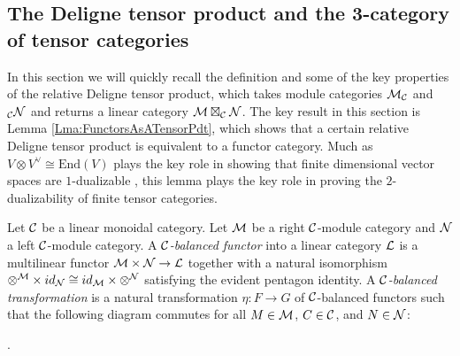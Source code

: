 \documentclass{amsart}
\begin{document}


\subsection{The Deligne tensor product and the 3-category of tensor categories} \label{sec:tc-deligne}

In this section we will quickly recall the definition and some of the key properties of the relative Deligne tensor product, which takes module categories $\mathcal M_\mathcal C$ and ${}_\mathcal C \mathcal N$ and returns a linear category $\mathcal M \boxtimes_\mathcal C \mathcal N$.  The key result in this section is Lemma \ref{Lma:FunctorsAsATensorPdt}, which shows that a certain relative Deligne tensor product is equivalent to a functor category.  Much as $V \otimes V^\vee \cong \mathrm{End}(V)$ plays the key role in showing that finite dimensional vector spaces are $1$-dualizable \cite[Ex. 1.1.9]{lurie-ch}, this lemma plays the key role in proving the $2$-dualizability of finite tensor categories.



\begin{definition}
	Let $\mathcal C$ be a linear monoidal category. 
	Let $\mathcal M$ be a right $\mathcal C$-module category and $\mathcal N$ a left $\mathcal C$-module category. A {\em $\mathcal C$-balanced functor} into a linear category $\mathcal L$ is a multilinear functor $\mathcal M \times \mathcal N \to \mathcal L$ together with a natural isomorphism $\otimes^{\mathcal M} \times id_{\mathcal N} \cong id_{\mathcal M} \times \otimes^{\mathcal N}$ satisfying the evident pentagon identity. A {\em $\mathcal C$-balanced transformation} is a natural transformation $\eta:F \to G$ of $\mathcal C$-balanced functors such that the following diagram commutes for all $M \in \mathcal M$, $C \in \mathcal C$, and $N \in \mathcal N$:
\begin{center}
.
\end{center}
\end{definition}
\end{document}
